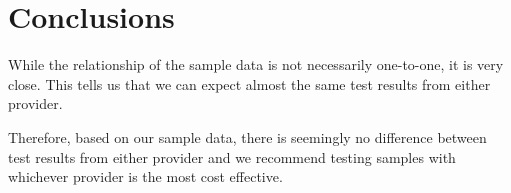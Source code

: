 \documentclass{article}
\begin{document}
  \section{Conclusions}\hrulefill

  While the relationship of the sample data is not necessarily one-to-one, it is very close. 
  This tells us that we can expect almost the same test results from either provider. 
  
  Therefore, based on our sample data, there is seemingly no difference between test results from either provider and we recommend testing samples with whichever provider is the most cost effective. 
\end{document}
